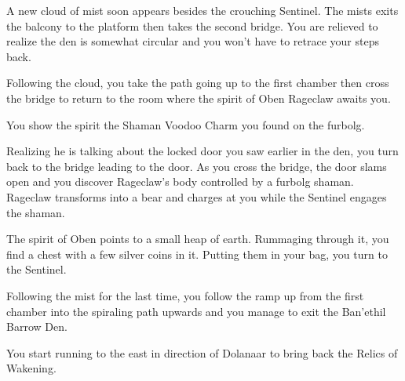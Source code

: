 

A new cloud of mist soon appears besides the crouching Sentinel. The mists exits the balcony to the platform then takes the second bridge. You are relieved to realize the den is somewhat circular and you won't have to retrace your steps back.

Following the cloud, you take the path going up to the first chamber then cross the bridge to return to the room where the spirit of Oben Rageclaw awaits you.



You show the spirit the Shaman Voodoo Charm you found on the furbolg.



Realizing he is talking about the locked door you saw earlier in the den, you turn back to the bridge leading to the door. As you cross the bridge, the door slams open and you discover Rageclaw's body controlled by a furbolg shaman. Rageclaw transforms into a bear and charges at you while the Sentinel engages the shaman. %


The spirit of Oben points to a small heap of earth. Rummaging through it, you find a chest with a few silver coins in it. Putting them in your bag, you turn to the Sentinel.



Following the mist for the last time, you follow the ramp up from the first chamber into the spiraling path upwards and you manage to exit the Ban'ethil Barrow Den.

You start running to the east in direction of Dolanaar to bring back the Relics of Wakening.

